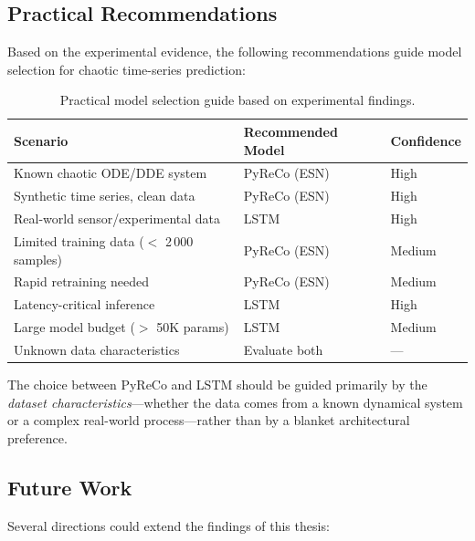 \subsection{Practical Recommendations}
\label{sec:recommendations}

Based on the experimental evidence, the following recommendations guide model selection for chaotic time-series prediction:

\begin{table}[H]
\centering
\caption{Practical model selection guide based on experimental findings.}
\label{tab:recommendations}
\begin{tabular}{@{}lll@{}}
\toprule
Scenario & Recommended Model & Confidence \\
\midrule
Known chaotic ODE/DDE system      & PyReCo (ESN) & High \\
Synthetic time series, clean data & PyReCo (ESN) & High \\
Real-world sensor/experimental data & LSTM        & High \\
Limited training data ($<$ 2\,000 samples) & PyReCo (ESN) & Medium \\
Rapid retraining needed           & PyReCo (ESN) & Medium \\
Latency-critical inference        & LSTM         & High \\
Large model budget ($>$ 50K params) & LSTM        & Medium \\
Unknown data characteristics      & Evaluate both & --- \\
\bottomrule
\end{tabular}
\end{table}

The choice between PyReCo and LSTM should be guided primarily by the \emph{dataset characteristics}---whether the data comes from a known dynamical system or a complex real-world process---rather than by a blanket architectural preference.

\subsection{Future Work}
\label{sec:future}

Several directions could extend the findings of this thesis:

